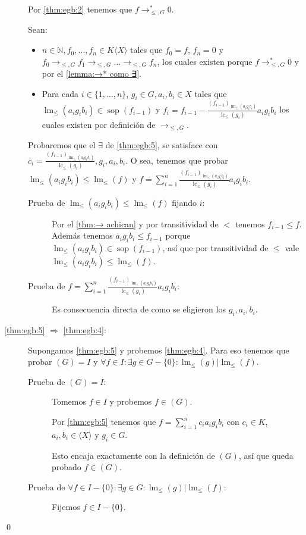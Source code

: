 \documentclass[12pt]{report}
\theoremstyle{customstyle}
\renewenvironment{proof}[1][\proofname]{{\noindent \bfseries #1: }}{\qed} %
\theoremstyle{factstyle}
\DeclareMathOperator{\sop}{sop}
\DeclareMathOperator{\lm}{lm}
\DeclareMathOperator{\lc}{lc}
\begin{document}
\begin{proof}
\begin{description}
    Por \ref{thm:egb:2} tenemos que $f →^*_{≤, G} 0$.

    Sean:
    \begin{itemize}
      \item $n ∈ ℕ, f_0, …, f_n ∈ K⟨X⟩$ tales que $f_0 = f$, $f_n = 0$ y $f_0 →_{≤, G} f_1 →_{≤, G} … →_{≤, G} f_n$, los cuales existen porque $f →^*_{≤, G} 0$ y por el \cref{lemma:→* como ∃}.
      \item Para cada $i ∈ \{1, …, n\}$, $g_i ∈ G, a_i, b_i ∈ X$ tales que $\lm_≤(a_i g_i b_i) ∈ \sop(f_{i-1})$ y $f_i = f_{i-1} - \frac{(f_{i-1})_{\lm_≤(a_i g_i b_i)}}{\lc_≤(g_i)}a_i g_i b_i$ los cuales existen por definición de $→_{≤, G}$.
    \end{itemize}

    Probaremos que el $∃$ de \ref{thm:egb:5}, se satisface con $c_i = \frac{(f_{i-1})_{\lm_≤(a_i g_i b_i)}}{\lc_≤(g_i)}, g_i, a_i, b_i$. O sea, tenemos que probar $\lm_≤(a_i g_i b_i) ≤ \lm_≤(f)$ y $f = ∑_{i = 1}^n \frac{(f_{i-1})_{\lm_≤(a_i g_i b_i)}}{\lc_≤(g_i)} a_i g_i b_i$.

    \begin{description}
      \item[Prueba de $\lm_≤(a_i g_i b_i) ≤ \lm_≤(f)$ fijando $i$:] Por el \cref{thm:→ achican} y por transitividad de $<$ tenemos $f_{i-1} ≤ f$. Además tenemos $a_i g_i b_i ≤ f_{i-1}$ porque $\lm_≤(a_i g_i b_i) ∈ \sop(f_{i-1})$, así que por transitividad de $≤$ vale $\lm_≤(a_i g_i b_i) ≤ \lm_≤(f)$.
      \item[Prueba de $f = ∑_{i = 1}^n \frac{(f_{i-1})_{\lm_≤(a_i g_i b_i)}}{\lc_≤(g_i)} a_i g_i b_i$:] Es consecuencia directa de como se eligieron los $g_i, a_i, b_i$.
    \end{description}

    \item[\ref{thm:egb:5} $⇒$ \ref{thm:egb:4}:] Supongamos \ref{thm:egb:5} y probemos \ref{thm:egb:4}. Para eso tenemos que probar $(G) = I$ y $∀f ∈ I : ∃g ∈ G - \{0\} : \lm_≤(g) | \lm_≤(f)$.

    \begin{description}
      \item[Prueba de $(G) = I$:] Tomemos $f ∈ I$ y probemos $f ∈ (G)$.

      Por \ref{thm:egb:5} tenemos que $f = ∑_{i = 1}^n c_i a_i g_i b_i$ con $c_i ∈ K$, $a_i, b_i ∈ ⟨X⟩$ y $g_i ∈ G$.

      Esto encaja exactamente con la definición de $(G)$, así que queda probado $f ∈ (G)$.

      \item[Prueba de $∀f ∈ I - \{0\} : ∃g ∈ G : \lm_≤(g) | \lm_≤(f)$:] Fijemos $f ∈ I - \{0\}$.


\end{description}
\end{description}
\end{proof}
\end{document}
